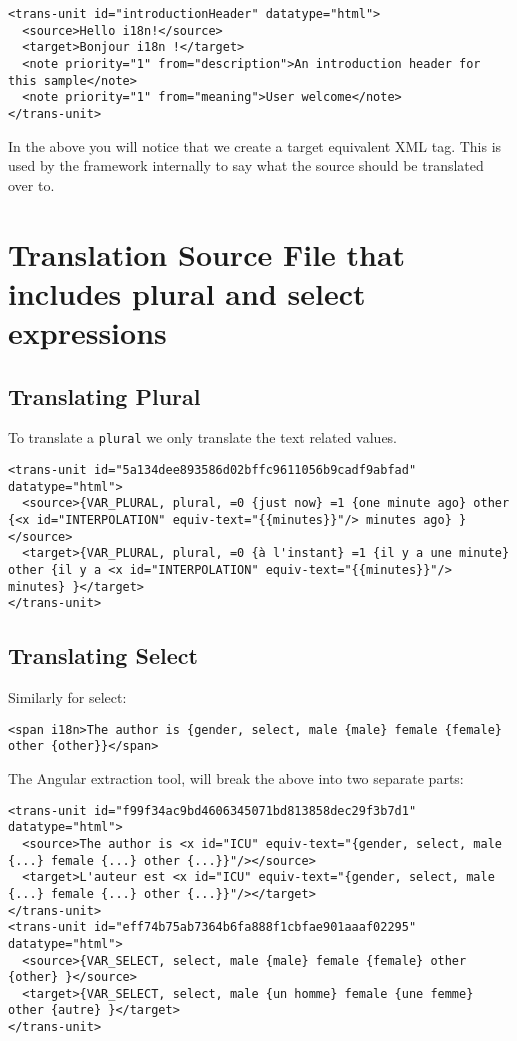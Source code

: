 \begin{lstlisting}[caption=src/locale/messages.fr.xlf(after translation)]
<trans-unit id="introductionHeader" datatype="html">
  <source>Hello i18n!</source>
  <target>Bonjour i18n !</target>
  <note priority="1" from="description">An introduction header for this sample</note>
  <note priority="1" from="meaning">User welcome</note>
</trans-unit>
\end{lstlisting}

In the above you will notice that we create a target equivalent XML tag. This is used by the framework internally to say what the source should be translated over to. 

\section{Translation Source File that includes plural and select expressions}

\subsection{Translating Plural}
To translate a \lstinline{plural} we only translate the text related values. 

\begin{lstlisting}[caption=src/locale/messages.fr.xlf]
<trans-unit id="5a134dee893586d02bffc9611056b9cadf9abfad" datatype="html">
  <source>{VAR_PLURAL, plural, =0 {just now} =1 {one minute ago} other {<x id="INTERPOLATION" equiv-text="{{minutes}}"/> minutes ago} }</source>
  <target>{VAR_PLURAL, plural, =0 {à l'instant} =1 {il y a une minute} other {il y a <x id="INTERPOLATION" equiv-text="{{minutes}}"/> minutes} }</target>
</trans-unit>  
\end{lstlisting}

\subsection{Translating Select}
Similarly for select: 
\begin{lstlisting}
<span i18n>The author is {gender, select, male {male} female {female} other {other}}</span>  
\end{lstlisting}

The Angular extraction tool, will break the above into two separate parts: 
\begin{lstlisting}[caption=src/locale/messages.fr.xlf]
<trans-unit id="f99f34ac9bd4606345071bd813858dec29f3b7d1" datatype="html">
  <source>The author is <x id="ICU" equiv-text="{gender, select, male {...} female {...} other {...}}"/></source>
  <target>L'auteur est <x id="ICU" equiv-text="{gender, select, male {...} female {...} other {...}}"/></target>
</trans-unit>  
<trans-unit id="eff74b75ab7364b6fa888f1cbfae901aaaf02295" datatype="html">
  <source>{VAR_SELECT, select, male {male} female {female} other {other} }</source>
  <target>{VAR_SELECT, select, male {un homme} female {une femme} other {autre} }</target>
</trans-unit>
\end{lstlisting}

